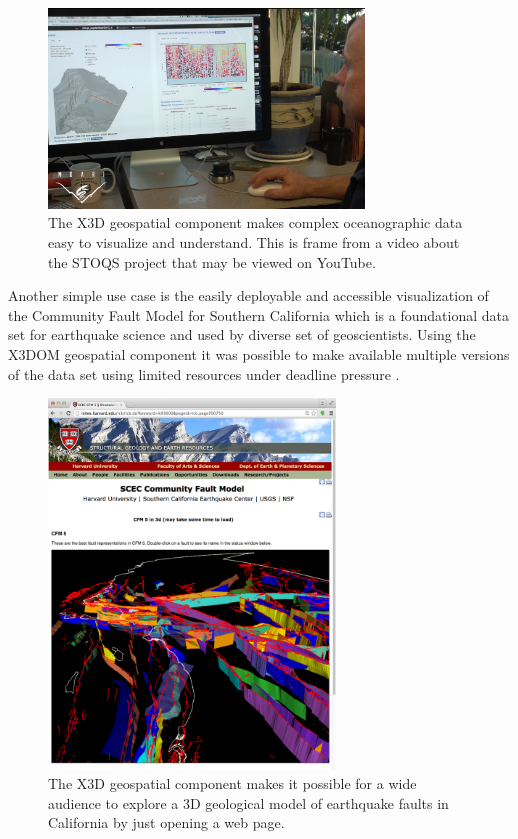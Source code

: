 \documentclass[review]{acmsiggraph}            %
\begin{document}
\begin{figure}[htbp] \centering \includegraphics[width=3.3in]{Application_STOQS.png} \caption{The
  X3D geospatial component makes complex oceanographic data easy to visualize and understand. This
is frame from a video about the STOQS project that may be viewed on YouTube.}
\label{fig:Application_STOQS.png} \end{figure}

Another simple use case is the easily deployable and accessible visualization of the Community Fault
Model for Southern California \cite{plesch07} which is a foundational data set for earthquake
science and used by diverse set of geoscientists. Using the X3DOM geospatial component it was
possible to make available multiple versions of the data set using limited resources under deadline
pressure \cite{sger14}.

\begin{figure}[htbp] \centering \includegraphics[width=3.0in]{Application_SCEC.png} \caption{The X3D
  geospatial component makes it possible for a wide audience to explore a 3D geological model of
earthquake faults in California by just opening a web page.} \label{fig:Application_SCEC.png}
\end{figure}
\end{document}
